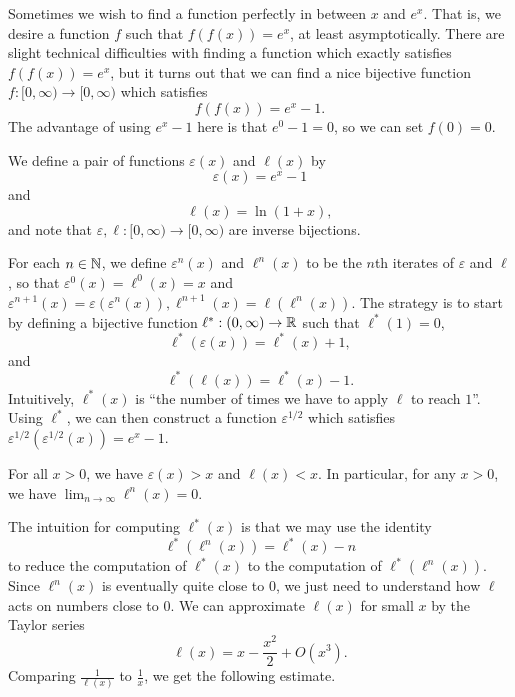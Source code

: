 \documentclass[letterpaper,11pt]{article}
\begin{document}
Sometimes we wish to find a function perfectly in between $x$ and $e^x$. That is, we desire a function $f$ such that $f(f(x)) = e^x$, at least asymptotically. There are slight technical difficulties with finding a function which exactly satisfies $f(f(x)) = e^x$, but it turns out that we can find a nice bijective function $f : [0,\infty) \rightarrow [0,\infty)$ which satisfies
\[
f(f(x)) = e^x - 1.
\]
The advantage of using $e^x - 1$ here is that $e^0 - 1 = 0$, so we can set $f(0) = 0$.

We define a pair of functions $\varepsilon(x)$ and $\ell(x)$ by
\[
\varepsilon(x) = e^x - 1
\]
and
\[
\ell(x) = \ln(1 + x),
\]
and note that $\varepsilon, \ell : [0,\infty) \rightarrow [0,\infty)$ are inverse bijections.

For each $n \in \mathbb{N}$, we define $\varepsilon^n(x)$ and $\ell^n(x)$ to be the $n$th iterates of $\varepsilon$ and $\ell$, so that $\varepsilon^0(x) = \ell^0(x) = x$ and $\varepsilon^{n+1}(x) = \varepsilon(\varepsilon^n(x)), \ell^{n+1}(x) = \ell(\ell^n(x))$. The strategy is to start by defining a bijective function $\ell^* : (0,\infty) \rightarrow \mathbb{R}$ such that $\ell^*(1) = 0$,
\[
\ell^*(\varepsilon(x)) = \ell^*(x) + 1,
\]
and
\[
\ell^*(\ell(x)) = \ell^*(x) - 1.
\]
Intuitively, $\ell^*(x)$ is ``the number of times we have to apply $\ell$ to reach $1$''. Using $\ell^*$, we can then construct a function $\varepsilon^{1/2}$ which satisfies $\varepsilon^{1/2}(\varepsilon^{1/2}(x)) = e^x - 1$.

\begin{prop} For all $x > 0$, we have $\varepsilon(x) > x$ and $\ell(x) < x$. In particular, for any $x > 0$, we have $\lim_{n \rightarrow \infty} \ell^n(x) = 0$.
\end{prop}

The intuition for computing $\ell^*(x)$ is that we may use the identity
\[
\ell^*(\ell^n(x)) = \ell^*(x) - n
\]
to reduce the computation of $\ell^*(x)$ to the computation of $\ell^*(\ell^n(x))$. Since $\ell^n(x)$ is eventually quite close to $0$, we just need to understand how $\ell$ acts on numbers close to $0$. We can approximate $\ell(x)$ for small $x$ by the Taylor series
\[
\ell(x) = x - \frac{x^2}{2} + O(x^3).
\]
Comparing $\frac{1}{\ell(x)}$ to $\frac{1}{x}$, we get the following estimate.
\end{document}
